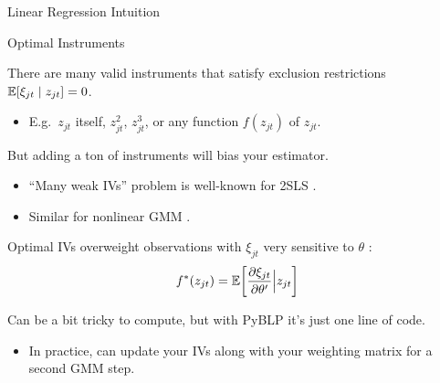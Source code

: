 \documentclass[aspectratio=169,t,11pt,table]{beamer}
\begin{document}
\begin{frame}{Linear Regression Intuition}
\begin{wideitemize}
    \end{wideitemize}
\end{frame}

\begin{frame}{Optimal Instruments}
    \begin{wideitemize}
        \item There are many valid instruments that satisfy exclusion restrictions $\mathbb{E}[\xi_{jt} \mid z_{jt}] = 0$.
        \begin{itemize}
            \item E.g.\ $z_{jt}$ itself, $z_{jt}^2$, $z_{jt}^3$, or any function $f(z_{jt})$ of $z_{jt}$.
        \end{itemize}
        \pause
        \item But adding a ton of instruments will bias your estimator.
        \begin{itemize}
            \item ``Many weak IVs'' problem is well-known for 2SLS \citep*{angrist1999jackknife}.
            \item Similar for nonlinear GMM \citep{han2006gmm,newey2009generalized}.
        \end{itemize}
        \pause
        \item \alert{Optimal IVs} overweight observations with $\xi_{jt}$ very sensitive to $\theta$ \citep{chamberlain1987asymptotic}:
        \begin{equation*}
            f^*(z_{jt}) = \mathbb{E}\bigg[\frac{\partial\xi_{jt}}{\partial\theta'} \Big| z_{jt}\bigg]
        \end{equation*}
        \vspace{-1.5\baselineskip}
        \pause
        \item Can be a bit tricky to compute, but with PyBLP it's just one line of code.
        \begin{itemize}
            \item In practice, can update your IVs along with your weighting matrix for a second GMM step.
        \end{itemize}
    \end{wideitemize}
\end{frame}
\end{document}
